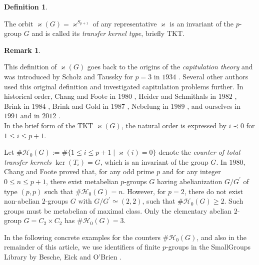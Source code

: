 \documentclass{amsart}
\theoremstyle{definition}
\newtheorem{definition}{Definition}[section]
\newtheorem{remark}{Remark}[section]
\numberwithin{equation}{section}
\begin{document}
\begin{definition}
\label{dfn:OrbitTypePePe}

The orbit \(\varkappa(G)=\varkappa^{S_{p+1}}\) of any representative \(\varkappa\)
is an invariant of the \(p\)-group \(G\) and is called its \textit{transfer kernel type}, briefly TKT.

\end{definition}


\begin{remark}
\label{dfn:CounterTypePePe}

This definition of \(\varkappa(G)\) goes back to the origins of the \textit{capitulation theory}
and was introduced by Scholz and Taussky for \(p=3\) in \(1934\)
\cite{SoTa}.
Several other authors used this original definition and investigated capitulation problems further.
In historical order, Chang and Foote in \(1980\)
\cite{CgFt},
Heider and Schmithals in \(1982\)
\cite{HeSm},
Brink in \(1984\)
\cite{Br},
Brink and Gold in \(1987\)
\cite{BrGo},
Nebelung in \(1989\)
\cite{Ne},
and ourselves in \(1991\)
\cite{Ma0}
and in \(2012\)
\cite{Ma2}.\\
In the brief form of the TKT \(\varkappa(G)\),
the natural order is expressed by \(i\prec 0\) for \(1\le i\le p+1\).

Let \(\#\mathcal{H}_0(G):=\#\lbrace 1\le i\le p+1\mid\varkappa(i)=0\rbrace\) denote
the \textit{counter of total transfer kernels} \(\ker(T_i)=G\),
which is an invariant of the group \(G\).
In \(1980\), Chang and Foote
\cite{CgFt}
proved that, for any odd prime \(p\) and for any integer \(0\le n\le p+1\),
there exist metabelian \(p\)-groups \(G\) having abelianization \(G/G^\prime\) of type \((p,p)\)
such that \(\#\mathcal{H}_0(G)=n\).
However, for \(p=2\), there do not exist non-abelian \(2\)-groups \(G\) with \(G/G^\prime\simeq (2,2)\),
such that \(\#\mathcal{H}_0(G)\ge 2\).
Such groups must be metabelian of maximal class.
Only the elementary abelian \(2\)-group \(G=C_2\times C_2\) has \(\#\mathcal{H}_0(G)=3\).

\end{remark}


In the following concrete examples for the counters \(\#\mathcal{H}_0(G)\),
and also in the remainder of this article,
we use identifiers of finite \(p\)-groups in the SmallGroups Library
by Besche, Eick and O'Brien
\cite{BEO1,BEO2}.
\end{document}
